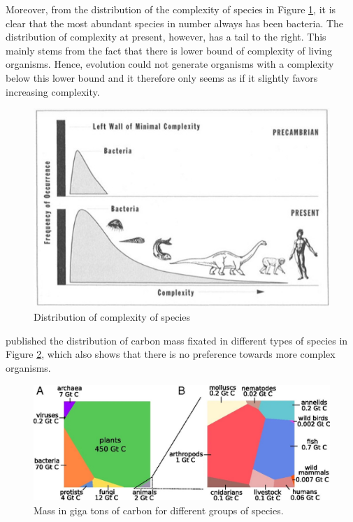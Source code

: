 \documentclass[
  11pt,
]{book}
\begin{document}
Moreover, from the distribution of the complexity of species in Figure \ref{fig:distributionComplexity}, it is clear that the most abundant species in number always has been bacteria.
The distribution of complexity at present, however, has a tail to the right.
This mainly stems from the fact that there is lower bound of complexity of living organisms. Hence, evolution could not generate organisms with a complexity below this lower bound and it therefore only seems as if it slightly favors increasing complexity.



\begin{figure}

{\centering \includegraphics[width=0.45\linewidth]{./figs/selectionNoDirectionDef} 

}

\caption{Distribution of complexity of species \citep{gould1997}}\label{fig:distributionComplexity}
\end{figure}

\citet{Bar-On2018} published the distribution of carbon mass fixated in different types of species in Figure \ref{fig:carbonFixated}, which also shows that there is no preference towards more complex organisms.



\begin{figure}

{\centering \includegraphics[width=1\linewidth]{./figs/pnas.1711842115fig01} 

}

\caption{Mass in giga tons of carbon for different groups of species. \citep{Bar-On2018}}\label{fig:carbonFixated}
\end{figure}
\end{document}
